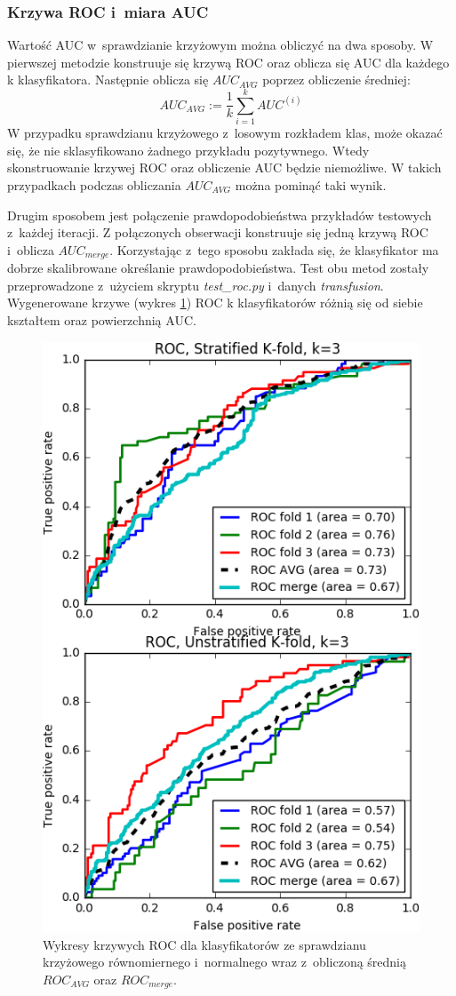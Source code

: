 \subsubsection{Krzywa ROC i~miara AUC}
Wartość AUC w~sprawdzianie krzyżowym można obliczyć na dwa sposoby. W pierwszej metodzie konstruuje się krzywą ROC oraz oblicza się AUC dla każdego k klasyfikatora. Następnie oblicza się $AUC_{AVG}$ poprzez obliczenie średniej:
\[AUC_{AVG} := \frac{1}{k} \sum_{i=1}^{k} AUC^{(i)} \]
W przypadku sprawdzianu krzyżowego z~losowym rozkładem klas, może okazać się, że nie sklasyfikowano żadnego przykładu pozytywnego. Wtedy skonstruowanie krzywej ROC oraz obliczenie AUC będzie niemożliwe. W takich przypadkach podczas obliczania $AUC_{AVG}$ można pominąć taki wynik. \par
Drugim sposobem jest połączenie prawdopodobieństwa przykładów testowych z~każdej iteracji. Z połączonych obserwacji konstruuje się jedną krzywą ROC i~oblicza $AUC_{merge}$. Korzystając z~tego sposobu zakłada się, że klasyfikator ma dobrze skalibrowane określanie prawdopodobieństwa.  Test obu metod zostały przeprowadzone z~użyciem skryptu \textit{test\_roc.py} i~danych \textit{transfusion}. Wygenerowane krzywe (wykres \ref{fig:cv_roc}) ROC k klasyfikatorów różnią się od siebie kształtem oraz powierzchnią AUC. 
\begin{figure}[H]
	\centering
	\includegraphics{./images/CV_ROC.png}
	\caption[Wykres krzywej ROC dla różnego sprawdzianu krzyżowego]{Wykresy krzywych ROC dla klasyfikatorów ze sprawdzianu krzyżowego równomiernego i~normalnego wraz z~obliczoną średnią $ROC_{AVG}$ oraz $ROC_{merge}$.}
	\label{fig:cv_roc}
\end{figure}
